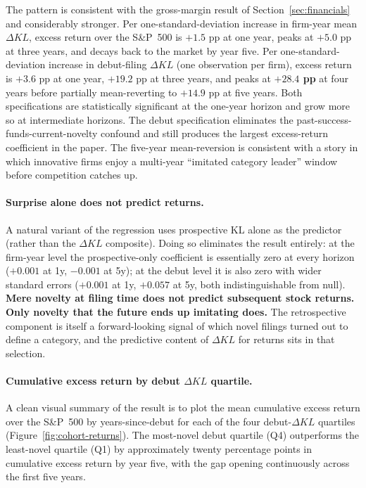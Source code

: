 \documentclass[11pt]{article}
\begin{document}
The pattern is consistent with the gross-margin result of
Section~\ref{sec:financials} and considerably stronger.
Per one-standard-deviation increase in firm-year mean $\Delta KL$,
excess return over the S\&P~500 is $+1.5$ pp at one year, peaks at
$+5.0$ pp at three years, and decays back to the market by year
five. Per one-standard-deviation increase in debut-filing
$\Delta KL$ (one observation per firm), excess return is $+3.6$ pp at
one year, $+19.2$ pp at three years, and peaks at \textbf{$+28.4$
pp} at four years before partially mean-reverting to $+14.9$ pp at
five years. Both specifications are statistically significant at the
one-year horizon and grow more so at intermediate horizons. The
debut specification eliminates the past-success-funds-current-novelty
confound and still produces the largest excess-return coefficient in
the paper. The five-year mean-reversion is consistent with a story
in which innovative firms enjoy a multi-year ``imitated category
leader'' window before competition catches up.

\paragraph{Surprise alone does not predict returns.}
A natural variant of the regression uses prospective KL alone as
the predictor (rather than the $\Delta KL$ composite). Doing so
eliminates the result entirely: at the firm-year level the
prospective-only coefficient is essentially zero at every horizon
($+0.001$ at 1y, $-0.001$ at 5y); at the debut level it is also
zero with wider standard errors ($+0.001$ at 1y, $+0.057$ at 5y,
both indistinguishable from null). \textbf{Mere novelty at filing
time does not predict subsequent stock returns. Only novelty
that the future ends up imitating does.} The retrospective
component is itself a forward-looking signal of which novel filings
turned out to define a category, and the predictive content of
$\Delta KL$ for returns sits in that selection.

\paragraph{Cumulative excess return by debut $\Delta KL$ quartile.}
A clean visual summary of the result is to plot the mean cumulative
excess return over the S\&P~500 by years-since-debut for each of
the four debut-$\Delta KL$ quartiles
(Figure~\ref{fig:cohort-returns}). The most-novel debut quartile
(Q4) outperforms the least-novel quartile (Q1) by approximately
twenty percentage points in cumulative excess return by year five,
with the gap opening continuously across the first five years.
\end{document}
